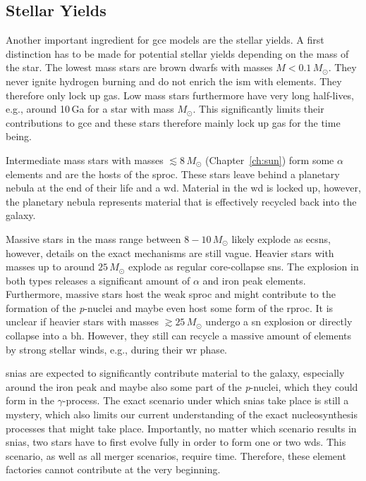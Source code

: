 \subsection{Stellar Yields}

Another important ingredient for \ac{gce} models are the stellar yields. A first distinction has to be made for potential stellar yields depending on the mass of the star. The lowest mass stars are brown dwarfs with masses $M<0.1\,M_\odot$. They never ignite hydrogen burning and do not enrich the \ac{ism} with elements. They therefore only lock up gas. Low mass stars furthermore have very long half-lives, e.g., around 10\,Ga for a star with mass $M_\odot$. This significantly limits their contributions to \ac{gce} and these stars therefore mainly lock up gas for the time being. 

Intermediate mass stars with masses $\lesssim 8\,M_\odot$ (Chapter~\ref{ch:sun}) form some $\alpha$ elements and are the hosts of the \ac{sproc}. These stars leave behind a planetary nebula at the end of their life and a \ac{wd}. Material in the \ac{wd} is locked up, however, the planetary nebula represents material that is effectively recycled back into the galaxy. 

Massive stars in the mass range between $8-10\,M_\odot$ likely explode as \acp{ecsn}, however, details on the exact mechanisms are still vague. Heavier stars with masses up to around $25\,M_\odot$ explode as regular core-collapse \acp{sn}. The explosion in both types releases a significant amount of $\alpha$ and iron peak elements. Furthermore, massive stars host the weak \ac{sproc} and might contribute to the formation of the \textit{p}-nuclei and maybe even host some form of the \ac{rproc}. It is unclear if heavier stars with masses $\gtrsim 25\,M_\odot$ undergo a \ac{sn} explosion or directly collapse into a \ac{bh}. However, they still can recycle a massive amount of elements by strong stellar winds, e.g., during their \ac{wr} phase.

\acp{snia} are expected to significantly contribute material to the galaxy, especially around the iron peak and maybe also some part of the \textit{p}-nuclei, which they could form in the $\gamma$-process. The exact scenario under which \acp{snia} take place is still a mystery, which also limits our current understanding of the exact nucleosynthesis processes that might take place. Importantly, no matter which scenario results in \acp{snia}, two stars have to first evolve fully in order to form one or two \acp{wd}. This scenario, as well as all merger scenarios, require time. Therefore, these element factories cannot contribute at the very beginning.

